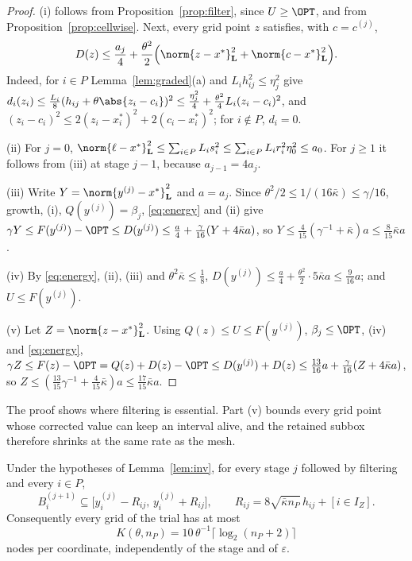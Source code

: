 \begin{proof}
(i) follows from Proposition~\ref{prop:filter}, since $U\ge\OPT$, and from
Proposition~\ref{prop:cellwise}. Next, every grid point $z$ satisfies, with
$c=c^{(j)}$,
\begin{equation}\label{eq:energy}
D(z)\le\frac{a_j}4+\frac{\theta^2}2\Bigl(\norm{z-x^*}_{\mathbf L}^2
+\norm{c-x^*}_{\mathbf L}^2\Bigr).
\end{equation}
Indeed, for $i\in P$ Lemma~\ref{lem:graded}(a) and $L_ih_{ij}^2\le\eta_j^2$ give
$d_i(z_i)\le\frac{L_i}8(h_{ij}+\theta\abs{z_i-c_i})^2\le\frac{\eta_j^2}4
+\frac{\theta^2}4L_i(z_i-c_i)^2$, and
$(z_i-c_i)^2\le2(z_i-x_i^*)^2+2(c_i-x_i^*)^2$; for $i\notin P$, $d_i=0$.

(ii) For $j=0$, $\norm{\ell-x^*}_{\mathbf L}^2\le\sum_{i\in P}L_is_i^2\le
\sum_{i\in P}L_ir_i^2\eta_0^2\le a_0$. For $j\ge1$ it follows from (iii) at
stage $j-1$, because $a_{j-1}=4a_j$.

(iii) Write $Y=\norm{y^{(j)}-x^*}_{\mathbf L}^2$ and $a=a_j$. Since
$\theta^2/2\le1/(16\bar\kappa)\le\gamma/16$, growth, (i), $Q(y^{(j)})=\beta_j$,
\eqref{eq:energy} and (ii) give
$\gamma Y\le F(y^{(j)})-\OPT\le D(y^{(j)})\le\frac a4+\frac\gamma{16}(Y+4\bar\kappa a)$,
so $Y\le\frac4{15}(\gamma^{-1}+\bar\kappa)a\le\frac8{15}\bar\kappa a$.

(iv) By \eqref{eq:energy}, (ii), (iii) and $\theta^2\bar\kappa\le\frac18$,
$D(y^{(j)})\le\frac a4+\frac{\theta^2}2\cdot5\bar\kappa a\le\frac9{16}a$; and
$U\le F(y^{(j)})$.

(v) Let $Z=\norm{z-x^*}_{\mathbf L}^2$. Using $Q(z)\le U\le F(y^{(j)})$,
$\beta_j\le\OPT$, (iv) and \eqref{eq:energy},
$\gamma Z\le F(z)-\OPT=Q(z)+D(z)-\OPT\le D(y^{(j)})+D(z)\le\frac{13}{16}a
+\frac\gamma{16}(Z+4\bar\kappa a)$, so
$Z\le(\frac{13}{15}\gamma^{-1}+\frac4{15}\bar\kappa)a\le\frac{17}{15}\bar\kappa a$.
\end{proof}

The proof shows where filtering is essential. Part (v) bounds every grid point
whose corrected value can keep an interval alive, and the retained subbox
therefore shrinks at the same rate as the mesh.

\begin{lemma}\label{lem:states}
Under the hypotheses of Lemma~\ref{lem:inv}, for every stage $j$ followed by
filtering and every $i\in P$,
\[
B_i^{(j+1)}\subseteq\bigl[y_i^{(j)}-R_{ij},\,y_i^{(j)}+R_{ij}\bigr],\qquad
R_{ij}=8\sqrt{\bar\kappa n_P}\,h_{ij}+[i\in I_Z].
\]
Consequently every grid of the trial has at most
\begin{equation}\label{eq:statecap}
K(\theta,n_P)=10\,\theta^{-1}\lceil\log_2(n_P+2)\rceil
\end{equation}
nodes per coordinate, independently of the stage and of $\varepsilon$.
\end{lemma}


